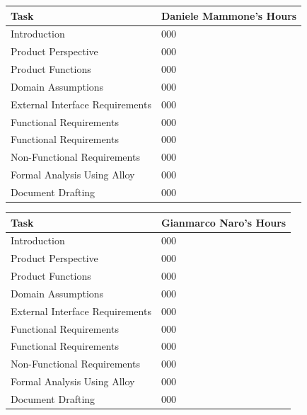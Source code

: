 \documentclass{article}
\newcommand\xrowht[2][0]
{\addstackgap[.5\dimexpr#2\relax]{\vphantom{#1}}}
\renewcommand{\arraystretch}{1.6}
\begin{document}
	\begin{center}
		
		\renewcommand{\arraystretch}{1.2}
		
			\begin{tabular}[h!]{|m{14em}|m{12em}|}
				\rowcolor{gray!20}
				\hline
				\xrowht{5pt}
				\centering Task & Daniele Mammone's Hours \\
				\hline
				Introduction & 000 \\
				\hline
				Product Perspective & 000 \\
				\hline
				Product Functions & 000 \\
				\hline
				Domain Assumptions & 000 \\
				\hline
				External Interface Requirements & 000 \\
				\hline
				Functional Requirements & 000 \\
				\hline
				Functional Requirements & 000 \\
				\hline
				Non-Functional Requirements & 000 \\
				\hline
				Formal Analysis Using Alloy & 000 \\
				\hline
				Document Drafting & 000 \\
				\hline
			\end{tabular}
		
	\end{center}

	\bigskip
	\bigskip
	\bigskip
	\bigskip

	\begin{center}
		
		\renewcommand{\arraystretch}{1.2}
		
		\begin{tabular}[h!]{|m{14em}|m{12em}|}
			\rowcolor{gray!20}
			\hline
			\xrowht{5pt}
			\centering Task & Gianmarco Naro's Hours \\
			\hline
			Introduction & 000 \\
			\hline
			Product Perspective & 000 \\
			\hline
			Product Functions & 000 \\
			\hline
			Domain Assumptions & 000 \\
			\hline
			External Interface Requirements & 000 \\
			\hline
			Functional Requirements & 000 \\
			\hline
			Functional Requirements & 000 \\
			\hline
			Non-Functional Requirements & 000 \\
			\hline
			Formal Analysis Using Alloy & 000 \\
			\hline
			Document Drafting & 000 \\
			\hline
		\end{tabular}
	\end{center}
\end{document}

